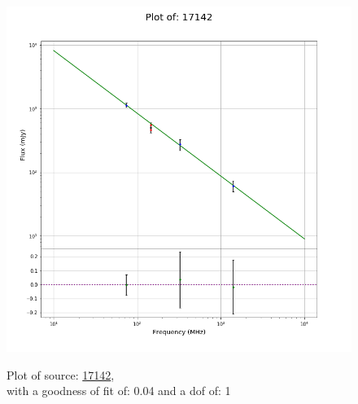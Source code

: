 \documentclass{article}
\begin{document}
\begin{figure}[H]
\begin{minipage}{0.5\textwidth}
        \includegraphics[scale = 0.35]{KmeulenTrap4P23_1min/1min17142.png}
        \captionsetup{labelformat=empty}
        \caption{Plot of source: \href{http://banana.transientskp.org/r4/vlo_KmeulenTrap4P23/runningcatalog/17142}{17142},\\with a goodness of fit of: 0.04 and a dof of: 1}
    \addtocounter{figure}{-1}
    \label{KmeulenTrap4P23:1min:17142:plot}
    \end{minipage}
\end{figure}
\end{document}
